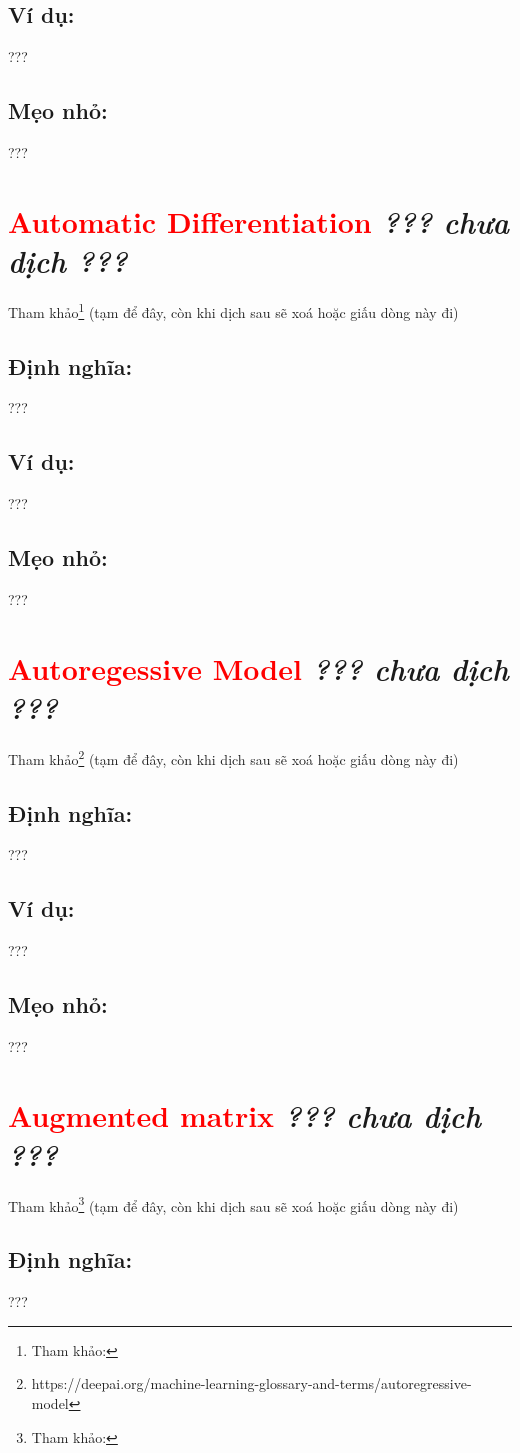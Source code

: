 \subsection*{Ví dụ:}
???
\subsection*{Mẹo nhỏ:}
???
\section*{\huge \textcolor{Red}{Automatic Differentiation}  \small \textit{??? chưa dịch ???} }
Tham khảo\footnote{Tham khảo:} (tạm để đây, còn khi dịch sau sẽ xoá hoặc giấu dòng này đi)
\subsection*{Định nghĩa:}
???
\subsection*{Ví dụ:}
???
\subsection*{Mẹo nhỏ:}
???
\section*{\huge \textcolor{Red}{Autoregessive Model}  \small \textit{??? chưa dịch ???} }
Tham khảo\footnote{https://deepai.org/machine-learning-glossary-and-terms/autoregressive-model} (tạm để đây, còn khi dịch sau sẽ xoá hoặc giấu dòng này đi)
\subsection*{Định nghĩa:}
???
\subsection*{Ví dụ:}
???
\subsection*{Mẹo nhỏ:}
???
\section*{\huge \textcolor{Red}{Augmented matrix}  \small \textit{??? chưa dịch ???} }
Tham khảo\footnote{Tham khảo:} (tạm để đây, còn khi dịch sau sẽ xoá hoặc giấu dòng này đi)
\subsection*{Định nghĩa:}
???
